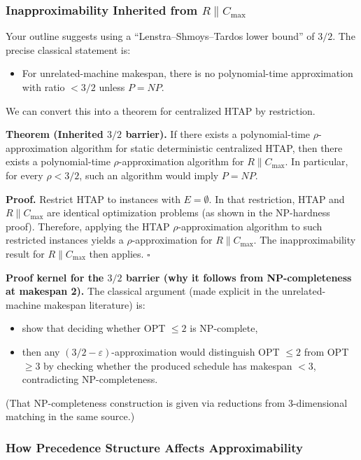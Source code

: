 \subsubsection{Inapproximability Inherited from \(R\parallel C_{\max}\)}

Your outline suggests using a ``Lenstra--Shmoys--Tardos lower bound'' of \(3/2\). The precise classical statement is:

\begin{itemize}
\item For unrelated-machine makespan, there is no polynomial-time approximation with ratio \(<3/2\) unless \(P=NP\).
\end{itemize}

We can convert this into a theorem for centralized HTAP by restriction.

\textbf{Theorem (Inherited \(3/2\) barrier).} If there exists a polynomial-time \(\rho\)-approximation algorithm for static deterministic centralized HTAP, then there exists a polynomial-time \(\rho\)-approximation algorithm for \(R\parallel C_{\max}\). In particular, for every \(\rho<3/2\), such an algorithm would imply \(P=NP\).

\textbf{Proof.} Restrict HTAP to instances with \(E=\emptyset\). In that restriction, HTAP and \(R\parallel C_{\max}\) are identical optimization problems (as shown in the NP-hardness proof). Therefore, applying the HTAP \(\rho\)-approximation algorithm to such restricted instances yields a \(\rho\)-approximation for \(R\parallel C_{\max}\). The inapproximability result for \(R\parallel C_{\max}\) then applies. \(\square\)

\textbf{Proof kernel for the \(3/2\) barrier (why it follows from NP-completeness at makespan 2).} The classical argument (made explicit in the unrelated-machine makespan literature) is:

\begin{itemize}
\item show that deciding whether OPT \(\le 2\) is NP-complete,
\item then any \((3/2-\varepsilon)\)-approximation would distinguish OPT \(\le 2\) from OPT \(\ge 3\) by checking whether the produced schedule has makespan \(<3\), contradicting NP-completeness.
\end{itemize}

(That NP-completeness construction is given via reductions from 3-dimensional matching in the same source.)

\subsubsection{How Precedence Structure Affects Approximability}

